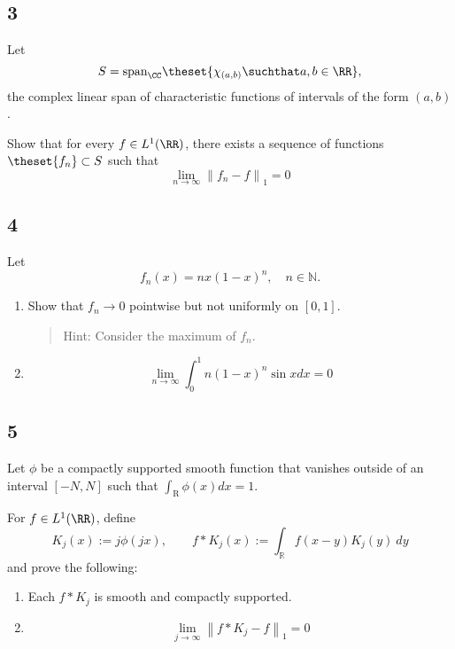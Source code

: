 \hypertarget{section-2}{%
\subsection{3}\label{section-2}}

Let \[
S = \mathrm{span}_\CC\theset{\chi_{(a, b)} \suchthat a, b \in \RR},
\] the complex linear span of characteristic functions of intervals of
the form \((a, b)\).

Show that for every \(f\in L^1(\RR)\), there exists a sequence of
functions \(\theset{f_n} \subset S\) such that \[
\lim _{n \rightarrow \infty}\left\|f_{n}-f\right\|_{1}=0
\]

\hypertarget{section-3}{%
\subsection{4}\label{section-3}}

Let \[
f_{n}(x)=n x(1-x)^{n}, \quad n \in \mathbb{N}.
\]

\begin{enumerate}
\def\labelenumi{\arabic{enumi}.}
\item
  Show that \(f_n \to 0\) pointwise but not uniformly on \([0, 1]\).

  \begin{quote}
  Hint: Consider the maximum of \(f_n\).
  \end{quote}
\item
  \[
  \lim _{n \rightarrow \infty} \int_{0}^{1} n(1-x)^{n} \sin x d x=0
  \]
\end{enumerate}

\hypertarget{section-4}{%
\subsection{5}\label{section-4}}

Let \(\phi\) be a compactly supported smooth function that vanishes
outside of an interval \([-N, N]\) such that
\(\int_{\mathrm{R}} \phi(x) d x=1\).

For \(f\in L^1(\RR)\), define \[
K_{j}(x):=j \phi(j x), \quad \quad f \ast K_{j}(x):=\int_{\mathbb{R}} f(x-y) K_{j}(y) ~d y
\] and prove the following:

\begin{enumerate}
\def\labelenumi{\arabic{enumi}.}
\item
  Each \(f\ast K_j\) is smooth and compactly supported.
\item
  \[
  \lim _{j \rightarrow \infty}\left\|f * K_{j}-f\right\|_{1}=0
  \]
\end{enumerate}

